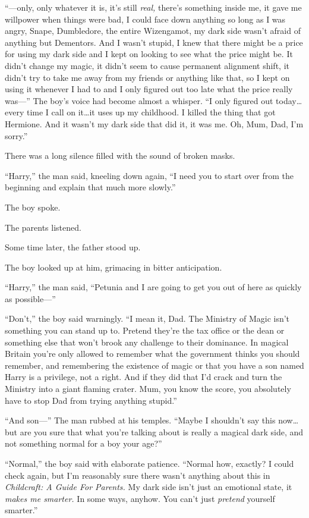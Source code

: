 “—only, only whatever it is, it’s still \emph{real,} there’s something inside me, it gave me willpower when things were bad, I could face down anything so long as I was angry, Snape, Dumbledore, the entire Wizengamot, my dark side wasn’t afraid of anything but Dementors. And I wasn’t stupid, I knew that there might be a price for using my dark side and I kept on looking to see what the price might be. It didn’t change my magic, it didn’t seem to cause permanent alignment shift, it didn’t try to take me away from my friends or anything like that, so I kept on using it whenever I had to and I only figured out too late what the price really was—” The boy’s voice had become almost a whisper. “I only figured out today…every time I call on it…it uses up my childhood. I killed the thing that got Hermione. And it wasn’t my dark side that did it, it was me. Oh, Mum, Dad, I’m sorry.”

There was a long silence filled with the sound of broken masks.

“Harry,” the man said, kneeling down again, “I need you to start over from the beginning and explain that much more slowly.”

The boy spoke.

The parents listened.

Some time later, the father stood up.

The boy looked up at him, grimacing in bitter anticipation.

“Harry,” the man said, “Petunia and I are going to get you out of here as quickly as possible—”

“Don’t,” the boy said warningly. “I mean it, Dad. The Ministry of Magic isn’t something you can stand up to. Pretend they’re the tax office or the dean or something else that won’t brook any challenge to their dominance. In magical Britain you’re only allowed to remember what the government thinks you should remember, and remembering the existence of magic or that you have a son named Harry is a privilege, not a right. And if they did that I’d crack and turn the Ministry into a giant flaming crater. Mum, you know the score, you absolutely have to stop Dad from trying anything stupid.”

“And son—” The man rubbed at his temples. “Maybe I shouldn’t say this now…but are you sure that what you’re talking about is really a magical dark side, and not something normal for a boy your age?”

“Normal,” the boy said with elaborate patience. “Normal how, exactly? I could check again, but I’m reasonably sure there wasn’t anything about this in \emph{Childcraft: A Guide For Parents.} My dark side isn’t just an emotional state, it \emph{makes me smarter.} In some ways, anyhow. You can’t just \emph{pretend} yourself smarter.”

